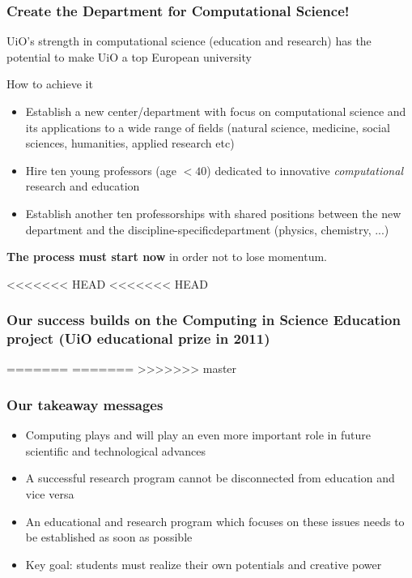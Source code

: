\documentclass{beamer}
\begin{document}
\begin{frame}
\frametitle{Create the Department for Computational Science!}

\begin{block}{}
UiO's strength in computational science (education and research)
has the potential to make UiO a top European university
\end{block}

\begin{block}{How to achieve it }
\begin{itemize}
\item Establish  a new center/department with focus on computational science and its applications to a wide range of fields (natural science, medicine, social sciences, humanities, applied research etc)

\item Hire ten young professors (age $< 40$) dedicated to innovative \emph{computational} research and education

\item Establish another ten professorships with  shared positions between the  new department and the discipline-specificdepartment (physics, chemistry, ...)
\end{itemize}

\noindent
\end{block}

\textbf{The process must start now} in order not to lose momentum.
\end{frame}

\begin{frame}
<<<<<<< HEAD
<<<<<<< HEAD
\frametitle{Our success builds on the Computing in Science Education project (UiO educational prize in 2011)}
=======
=======
>>>>>>> master
\frametitle{Our takeaway messages}

\begin{block}{}
\begin{itemize}
\item Computing plays and will play an even more important role in future scientific and technological advances

\item A successful research program cannot be disconnected from education and vice versa

\item An educational and research program which focuses on these issues needs to be established as soon as possible

\item Key goal: students must realize their own potentials and creative power
\end{itemize}

\noindent
\end{block}
\end{frame}
\end{document}
